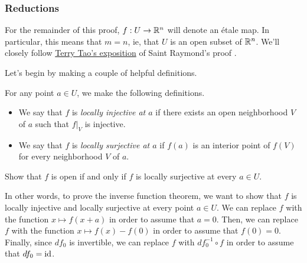 \subsubsection*{Reductions}

For the remainder of this proof, $f : U \to \mathbb{R}^n$ will denote an \'etale map. In particular, this means that $m = n$, ie, that $U$ is an open subset of $\mathbb{R}^n$. We'll closely follow  \href{https://terrytao.wordpress.com/2011/09/12/the-inverse-function-theorem-for-everywhere-differentiable-maps/#more-5298}{Terry Tao's exposition} of Saint Raymond's proof \cite{saint-raymond}. 

Let's begin by making a couple of helpful definitions. 

\begin{definition}
	For any point $a \in U$, we make the following definitions. 
	\begin{itemize}
		\item We say that $f$ is \emph{locally injective at $a$} if there exists an open neighborhood $V$ of $a$ such that $f|_V$ is injective. 
		\item We say that $f$ is \emph{locally surjective at $a$} if $f(a)$ is an interior point of $f(V)$ for every neighborhood $V$ of $a$. 
	\end{itemize}
\end{definition}

\begin{exercise}
	Show that $f$ is open if and only if $f$ is locally surjective at every $a \in U$. 
\end{exercise}

In other words, to prove the inverse function theorem, we want to show that $f$ is locally injective and locally surjective at every point $a \in U$. We can replace $f$ with the function $x \mapsto f(x+a)$ in order to assume that $a = 0$. Then, we can replace $f$ with the function $x \mapsto f(x) - f(0)$ in order to assume that $f(0) = 0$. Finally, since $df_0$ is invertible, we can replace $f$ with $df_0^{-1} \circ f$ in order to assume that $df_0 = \mathrm{id}$. 

